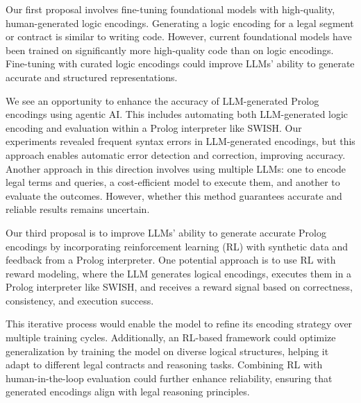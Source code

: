 Our first proposal involves fine-tuning foundational models with high-quality, human-generated logic encodings. Generating a logic encoding for a legal segment or contract is similar to writing code. However, current foundational models have been trained on significantly more high-quality code than on logic encodings. Fine-tuning with curated logic encodings could improve LLMs’ ability to generate accurate and structured representations.

We see an opportunity to enhance the accuracy of LLM-generated Prolog encodings using agentic AI. This includes automating both LLM-generated logic encoding and evaluation within a Prolog interpreter like SWISH. Our experiments revealed frequent syntax errors in LLM-generated encodings, but this approach enables automatic error detection and correction, improving accuracy. Another approach in this direction involves using multiple LLMs: one to encode legal terms and queries, a cost-efficient model to execute them, and another to evaluate the outcomes. 
However, whether this method guarantees accurate and reliable results remains uncertain.

Our third proposal is to improve LLMs’ ability to generate accurate Prolog encodings by incorporating reinforcement learning (RL) with synthetic data and feedback from a Prolog interpreter. One potential approach is to use RL with reward modeling, where the LLM generates logical encodings, executes them in a Prolog interpreter like SWISH, and receives a reward signal based on correctness, consistency, and execution success. 

This iterative process would enable the model to refine its encoding strategy over multiple training cycles. Additionally, an RL-based framework could optimize generalization by training the model on diverse logical structures, helping it adapt to different legal contracts and reasoning tasks. Combining RL with human-in-the-loop evaluation could further enhance reliability, ensuring that generated encodings align with legal reasoning principles.


